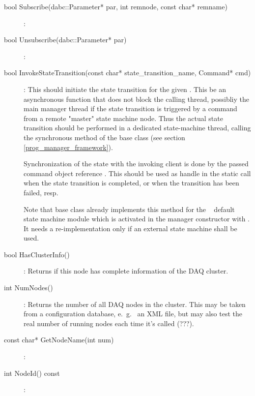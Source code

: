\begin{description}
\item[bool Subscribe(dabc::Parameter* par, int remnode, 
const char* remname)] :

\item[bool Unsubscribe(dabc::Parameter* par)] : 



    
\item[bool InvokeStateTransition(const char* state\_transition\_name, 
Command* cmd)] : 
This should initiate the state transition for the given .
This  be an asynchronous function that does not block the calling thread,
possibliy the main manager thread if the state transition is triggered by a command
from a remote "master" state machine node. Thus the actual state transition should be performed in a dedicated state-machine thread, calling the synchronous method
 of the base class (see section \ref{prog_manager_framework}).

Synchronization of the state with the invoking client is done by
the passed command object reference . 
This should be used as handle in the static call  when the state transition is completed, or  when the transition has been failed, resp.

Note that base class  already implements this method for the 
\dabc~ default state machine module which is activated in the
manager constructor with . It needs a re-implementation only if
an external state machine shall be used.







\item[bool HasClusterInfo()]:
Returns  if this node has complete information of the DAQ cluster.




\item[int NumNodes()] :
Returns the number of all DAQ nodes in the cluster. This may be taken
from a configuration database, e.~g.~ an XML file, but may also test the
real number of running nodes each time it's called (???).

\item[const char* GetNodeName(int num)] :



\item[int NodeId() const] :


\end{description}
